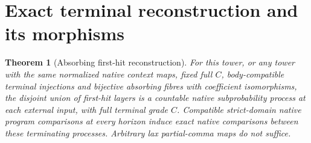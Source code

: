 \documentclass{article}
\newtheorem{theorem}{Theorem}\newtheorem{proposition}[theorem]{Proposition}
\begin{document}
\section{Exact terminal reconstruction and its morphisms}
\begin{theorem}[Absorbing first-hit reconstruction]
For this tower, or any tower with the same normalized native context maps,
fixed full $C$, body-compatible terminal injections and bijective absorbing
fibres with coefficient isomorphisms, the disjoint union of first-hit layers
is a countable native subprobability process at each external input, with
full terminal grade $C$. Compatible strict-domain native program comparisons
at every horizon induce exact native comparisons between these terminating
processes. Arbitrary lax partial-comma maps do not suffice.
\end{theorem}
\end{document}
